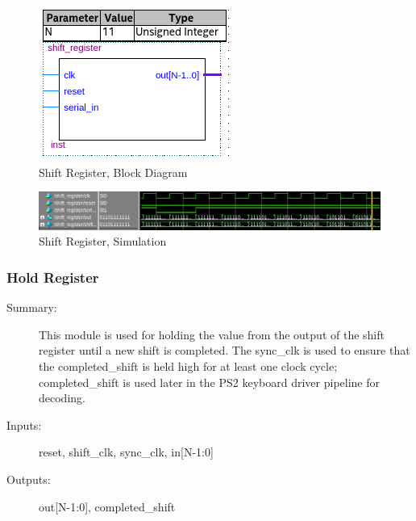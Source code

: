 \documentclass[a4paper]{article}
\begin{document}
        \vspace{.25 in}
        \begin{figure}[h]
          \centering
            \includegraphics[width=.5\textwidth]{Images/silas_blocks/shift_reg_bd.png}
        	\caption{Shift Register, Block Diagram}
            \label{fig:shift_register_bd}
        \end{figure}
        
        \vspace{.25 in}
        \begin{figure}[h]
          \centering
            \includegraphics[width=5.91in]{Images/silas_sims/shift_register.png}
        	\caption{Shift Register, Simulation}
            \label{fig:shift_register_sim}
        \end{figure}
    \subsubsection{Hold Register}
        \begin{description}
            \item[Summary: ] This module is used for holding the value from the output of the shift register until a new shift is completed.  The sync\_clk is used to ensure that the completed\_shift is held high for at least one clock cycle;  completed\_shift is used later in the PS2 keyboard driver pipeline for decoding.
            \item[Inputs: ] reset, shift\_clk, sync\_clk, in[N-1:0]
            \item[Outputs: ] out[N-1:0], completed\_shift
        \end{description}
        
\end{document}
